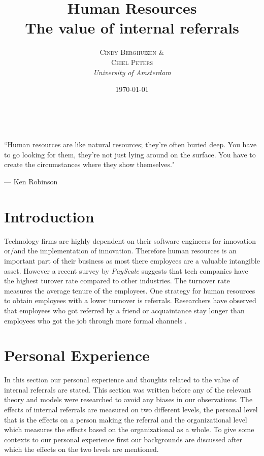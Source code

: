 \documentclass[a4paper, 11pt]{article} %
\title{\textbf{Human Resources}\\ %
The value of internal referrals} %
\author{\textsc{Cindy Berghuizen \& \\ Chiel Peters} %
\\{\textit{University of Amsterdam}}} %
\date{\today} %
\makeatletter
\renewcommand{\maketitle}{ %
\begin{flushright} %
{\LARGE\@title} %

\vspace{50pt} %

{\large\@author} %
\\\@date %

\vspace{20pt} %
\end{flushright}
}
\makeatother
\begin{document}
\maketitle %



\epigraph{``Human resources are like natural resources; they're often buried deep. You have to go looking for them, they're not just lying around on the surface. You have to create the circumstances where they show themselves."}{--- \textup{Ken Robinson}}

\begin{abstract}
\end{abstract}


\vspace{30pt} %


\section*{Introduction}


Technology firms are highly dependent on their software engineers for innovation or/and the implementation of innovation. Therefore human resources is an important part of their business as most there employees are a valuable intangible asset. However a recent survey by \textit{PayScale} \cite{turnover} suggests that tech companies have the highest turover rate compared to other industries. The turnover rate measures the average tenure of the employees. One strategy for human resources to obtain employees with a lower turnover is referrals. Researchers have observed that employees who got referred by a friend or acquaintance stay longer than employees who got the job through more formal channels \cite{sixth,ten}. 


\section*{Personal Experience}
In this section our personal experience and thoughts related to the value of internal referrals are stated. This section was written before any of the relevant theory and models were researched to avoid any biases in our observations. The effects of internal referrals are measured on two different levels, the personal level that is the effects on a person making the referral and the organizational level which measures the effects based on the organizational as a whole. To give some contexts to our personal experience first our backgrounds are discussed after which the effects on the two levels are mentioned.
\end{document}
